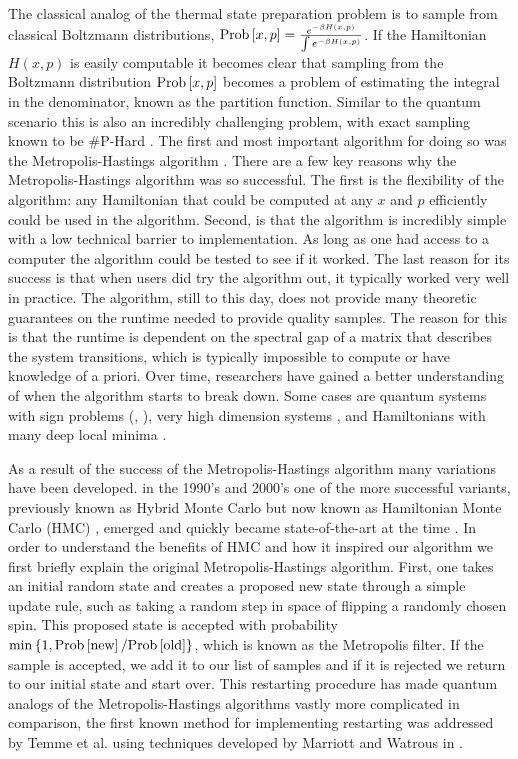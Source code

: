 \documentclass{article}
\newcommand{\set}[1]{\left\{ #1 \right\}}
\newcommand{\prob}[1]{{\rm Prob}\left[ #1 \right]}
\begin{document}
The classical analog of the thermal state preparation problem is to sample from classical Boltzmann distributions, $\prob{x, p} = \frac{e^{-\beta H(x, p)}}{\int e^{-\beta H(x, p)}}$. If the Hamiltonian $H(x,p)$ is easily computable it becomes clear that sampling from the Boltzmann distribution $\prob{x,p}$ becomes a problem of estimating the integral in the denominator, known as the partition function. Similar to the quantum scenario this is also an incredibly challenging problem, with exact sampling known to be \#P-Hard \cite{roth1996hardness}. The first and most important algorithm for doing so was the Metropolis-Hastings algorithm \cite{metropolis1953equation}. There are a few key reasons why the Metropolis-Hastings algorithm was so successful. The first is the flexibility of the algorithm: any Hamiltonian that could be computed at any $x$ and $p$ efficiently could be used in the algorithm. Second, is that the algorithm is incredibly simple with a low technical barrier to implementation. As long as one had access to a computer the algorithm could be tested to see if it worked. The last reason for its success is that when users did try the algorithm out, it typically worked very well in practice. The algorithm, still to this day, does not provide many theoretic guarantees on the runtime needed to provide quality samples. The reason for this is that the runtime is dependent on the spectral gap of a matrix that describes the system transitions, which is typically impossible to compute or have knowledge of a priori. Over time, researchers have gained a better understanding of when the algorithm starts to break down. Some cases are quantum systems with sign problems (\cite{signProblemOG}, \cite{troyer2005sign}), very high dimension systems \cite{beskos2010optimaltuninghybridmontecarlo}, and Hamiltonians with many deep local minima \cite{betancourt2018conceptualintroductionhamiltonianmonte}. 

As a result of the success of the Metropolis-Hastings algorithm many variations have been developed. in the 1990's and 2000's one of the more successful variants, previously known as Hybrid Monte Carlo but now known as Hamiltonian Monte Carlo (HMC) \cite{neal1993probabilistic}, emerged and quickly became state-of-the-art at the time \cite{hoffman2011nouturnsampleradaptivelysetting}. In order to understand the benefits of HMC and how it inspired our algorithm we first briefly explain the original Metropolis-Hastings algorithm. First, one takes an initial random state and creates a proposed new state through a simple update rule, such as taking a random step in space of flipping a randomly chosen spin. This proposed state is accepted with probability $\min \set{1, \prob{\text{new}} / \prob{\text{old}}}$, which is known as the Metropolis filter. If the sample is accepted, we add it to our list of samples and if it is rejected we return to our initial state and start over. This restarting procedure has made quantum analogs of the Metropolis-Hastings algorithms vastly more complicated in comparison, the first known method for implementing restarting was addressed by Temme et al. \cite{temme2011} using techniques developed by Marriott and Watrous in \cite{marriott2005quantum}. 
\end{document}
